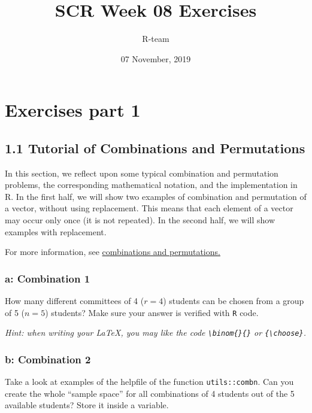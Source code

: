 \documentclass[]{article}
\title{SCR Week 08 Exercises}
\author{R-team}
\date{07 November, 2019}
\begin{document}
\maketitle

\hypertarget{exercises-part-1}{%
\section{Exercises part 1}\label{exercises-part-1}}

\hypertarget{tutorial-of-combinations-and-permutations}{%
\subsection{1.1 Tutorial of Combinations and
Permutations}\label{tutorial-of-combinations-and-permutations}}

In this section, we reflect upon some typical combination and
permutation problems, the corresponding mathematical notation, and the
implementation in R. In the first half, we will show two examples of
combination and permutation of a vector, without using replacement. This
means that each element of a vector may occur only once (it is not
repeated). In the second half, we will show examples with replacement.

For more information, see
\href{http://www.mathsisfun.com/combinatorics/combinations-permutations.html}{combinations
and permutations.}

\hypertarget{a-combination-1}{%
\subsubsection{a: Combination 1}\label{a-combination-1}}

How many different committees of 4 (\(r = 4\)) students can be chosen
from a group of 5 (\(n = 5\)) students? Make sure your answer is
verified with \texttt{R} code.

\emph{Hint: when writing your \LaTeX, you may like the code
\texttt{\textbackslash{}binom\{\}\{\}} or
\texttt{\{\textbackslash{}choose\}}.}

\hypertarget{b-combination-2}{%
\subsubsection{b: Combination 2}\label{b-combination-2}}

Take a look at examples of the helpfile of the function
\texttt{utils::combn}. Can you create the whole ``sample space'' for all
combinations of 4 students out of the 5 available students? Store it
inside a variable.
\end{document}
